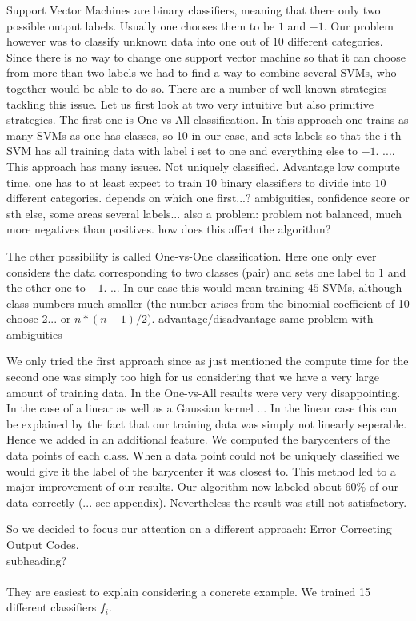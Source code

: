 Support Vector Machines are binary classifiers, meaning that there only two possible output labels. Usually one chooses them to be $1$ and $-1$. Our problem however was to classify unknown data into one out of $10$ different categories. Since there is no way to change one support vector machine so that it can choose from more than two labels we had to find a way to combine several SVMs, who together would be able to do so. There are a number of well known strategies tackling this issue. Let us first look at two very intuitive but also primitive strategies. The first one is One-vs-All classification. In this approach one trains as many SVMs as one has classes, so 10 in our case, and sets labels so that the i-th SVM has all training data with label i set to one and everything else to $-1$. .... This approach has many issues. Not uniquely classified. Advantage low compute time, one has to at least expect to train $10$ binary classifiers to divide into $10$ different categories. depends on which one first...? ambiguities, confidence score or sth else, some areas several labels...  also a problem: problem not balanced, much more negatives than positives. how does this affect the algorithm?

The other possibility is called One-vs-One classification. Here one only ever considers the data corresponding to two classes (pair) and sets one label to $1$ and the other one to $-1$. ... 
In our case this would mean training $45$ SVMs, although class numbers much smaller (the number arises from the binomial coefficient of 10 choose 2... or $n*(n-1)/2$). advantage/disadvantage same problem with ambiguities

We only tried the first approach since as just mentioned the compute time for the second one was simply too high for us considering that we have a very large amount of training data. In the One-vs-All results were very very disappointing. In the case of a linear as well as a Gaussian kernel ... In the linear case this can be explained by the fact that our training data was simply not linearly seperable. 
Hence we added in an additional feature. We computed the barycenters of the data points of each class. When a data point could not be uniquely classified we would give it the label of the barycenter it was closest to. This method led to a major improvement of our results. Our algorithm now labeled about 60\% of our data correctly (... see appendix).  Nevertheless the result was still not satisfactory. 

So we decided to focus our attention on a different approach: Error Correcting Output Codes. 
\\
subheading? \\
\\
They are easiest to explain considering a concrete example. We trained 15 different classifiers $f_i$. 

